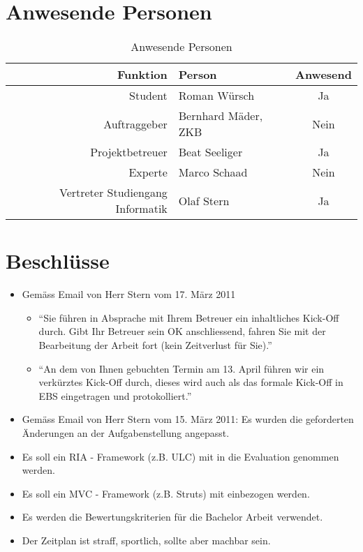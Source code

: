   \section{Anwesende Personen}
    
  \begin{table}[ht]
    \sffamily 
    \begin{center}
      \begin{tabular}{rlc}
        \toprule
        \textbf{Funktion} & \textbf{Person} & \textbf{Anwesend}\\
        \midrule
        Student & Roman Würsch & Ja\\
        Auftraggeber & Bernhard Mäder, ZKB & Nein\\
        Projektbetreuer & Beat Seeliger & Ja\\
        Experte & Marco Schaad & Nein\\
        Vertreter Studiengang Informatik & Olaf Stern & Ja\\
        \bottomrule
      \end{tabular}
      \captionsetup{list=no}
      \caption{Anwesende Personen}
      \label{tab:anwesendePersonen}
    \end{center}
  \end{table}

  \section{Beschlüsse}
  \begin{itemize}
      \item Gemäss Email von Herr Stern vom 17. März 2011
      \begin{itemize}
        \item ``Sie führen in Absprache mit Ihrem Betreuer ein inhaltliches
        Kick-Off durch. Gibt Ihr Betreuer sein OK anschliessend, fahren Sie
        mit der Bearbeitung der Arbeit fort (kein Zeitverlust für Sie).''
        \item ``An dem von Ihnen gebuchten Termin am 13. April führen wir
        ein verkürztes Kick-Off durch, dieses wird auch als das formale
        Kick-Off in EBS eingetragen und protokolliert.''
      \end{itemize} 
      \item Gemäss Email von Herr Stern vom 15. März 2011: Es wurden
      die geforderten Änderungen an der Aufgabenstellung angepasst.
      \item Es soll ein RIA - Framework (z.B. ULC) mit in die Evaluation
      genommen werden.
      \item Es soll ein MVC - Framework (z.B. Struts) mit einbezogen
      werden.
      \item Es werden die Bewertungskriterien für die Bachelor Arbeit verwendet.
      \item Der Zeitplan ist straff, sportlich, sollte aber machbar sein.
  \end{itemize}